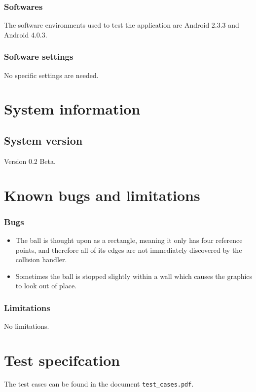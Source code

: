 \documentclass[a4paper,titlepage]{article}
\begin{document}
\subsubsection{Softwares}
The software environments used to test the application are Android 2.3.3 and
Android 4.0.3.
\subsubsection{Software settings}
No specific settings are needed.

\newpage
\section{System information}
\subsection{System version}
Version 0.2 Beta.

\newpage
\section{Known bugs and limitations}
\subsubsection{Bugs}
\begin{itemize}
  \item The ball is thought upon as a rectangle, meaning it only has four reference points, and therefore all of its edges are not immediately discovered by the collision handler.
  \item Sometimes the ball is stopped slightly within a wall which causes the graphics to look out of place.
\end{itemize}

\subsubsection{Limitations}
No limitations.

\newpage
\section{Test specifcation}
The test cases can be found in the document \texttt{test\_cases.pdf}.
\end{document}

